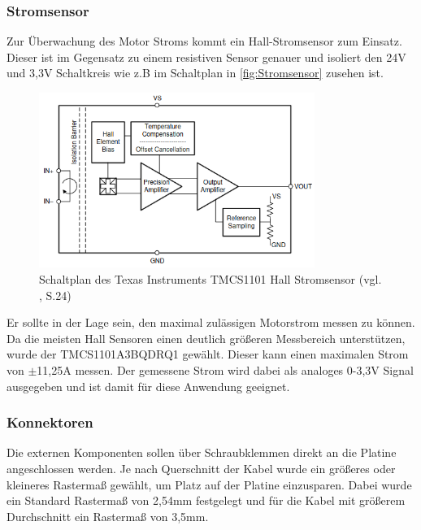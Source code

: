 \subsubsection{Stromsensor}
Zur Überwachung des Motor Stroms kommt ein Hall-Stromsensor zum Einsatz. Dieser ist im Gegensatz zu einem resistiven Sensor genauer und isoliert den 24V und 3,3V Schaltkreis wie z.B im Schaltplan in \autoref{fig:Stromsensor} zusehen ist. 
\begin{figure}[H]
	\centering
	\includegraphics[width=0.8\textwidth]{images/Hardware/Stromsensor_Schaltplan.png}
	\caption{Schaltplan des Texas Instruments TMCS1101 Hall Stromsensor (vgl. \cite{Stromsensor_texas}, S.24)}
	\label{fig:Stromsensor}
\end{figure}
Er sollte in der Lage sein, den maximal zulässigen Motorstrom messen zu können. Da die meisten Hall Sensoren einen deutlich größeren Messbereich unterstützen, wurde der TMCS1101A3BQDRQ1 gewählt. Dieser kann einen maximalen Strom von $\pm$11,25A messen. Der gemessene Strom wird dabei als analoges 0-3,3V Signal ausgegeben und ist damit für diese Anwendung geeignet.
\subsubsection{Konnektoren}
Die externen Komponenten sollen über Schraubklemmen direkt an die Platine angeschlossen werden. Je nach Querschnitt der Kabel wurde ein größeres oder kleineres Rastermaß gewählt, um Platz auf der Platine einzusparen. Dabei wurde ein Standard Rastermaß von 2,54mm festgelegt und für die Kabel mit größerem Durchschnitt ein Rastermaß von 3,5mm.

